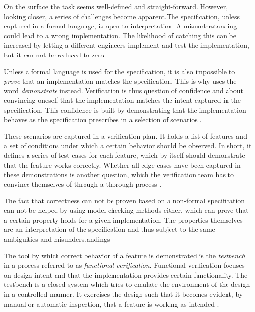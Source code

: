 On the surface the task seems well-defined and straight-forward. However, looking closer, a series of challenges
become apparent.The specification, unless captured in a formal language, is open to interpretation. A
misunderstanding could lead to a wrong implementation. The likelihood of catching this can be increased by
letting a different engineers implement and test the implementation, but it can not be reduced to zero \cite[Ch.
1]{bergeron2012writing}.

Unless a formal language is used for the specification, it is also impossible to \textit{prove} that an
implementation matches the specification. This is why \citeauthor{bergeron2012writing} uses the word
\textit{demonstrate} instead. Verification is thus question of confidence and about convincing oneself that the
implementation matches the intent captured in the specification. This confidence is built by demonstrating that the
implementation behaves as the specification prescribes in a selection of scenarios \cite[Ch. 1]{bergeron2012writing}.

These scenarios are captured in a verification plan. It holds a list of features and a set of conditions under which
a certain behavior should be observed. In short, it defines a series of test cases for each feature, which by itself
should demonstrate that the feature works correctly. Whether all edge-cases have been captured in these
demonstrations is another question, which the verification team has to convince themselves of through a thorough
process \cite[Ch. 1]{bergeron2012writing}.

The fact that correctness can not be proven based on a non-formal specification can not be helped by using model checking
methods either, which can prove that a certain property holds for a given implementation. The properties themselves
are an interpretation of the specification and thus subject to the same ambiguities and misunderstandings \cite[Ch.
1]{bergeron2012writing}.

The tool by which correct behavior of a feature is demonstrated is the \textit{testbench} in a process referred to as
\textit{functional verification}. Functional verification focuses on design intent and that the implementation
provides certain functionality. The testbench is a closed system which tries to emulate the environment of the design
in a controlled manner. It exercises the design such that it becomes evident, by manual or automatic inspection, that
a feature is working as intended \cite[Ch. 1]{bergeron2012writing}.

